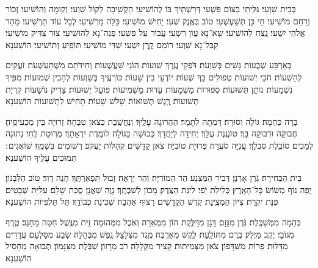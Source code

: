 \documentclass[twoside, openany, parskip=half, 11pt]{book}
\begin{document}
בְּבֵית שַׁוְעִי׃ גִּלִּֽיתִי בַצּוֹם פִּשְׁעִי׃ דְּרַשְׁתִּֽיךָ בּוֹ לְהוֹשִׁיעִי׃ הַקְשִֽׁיבָה לְקוֹל שַׁוְעִי׃ וְקֽוּמָה וְהוֹשִׁיעִי׃ זְכוֹר וְרַחֵם מוֹשִׁיעִי׃ חַי כֵּן תְּשַׁעְשְׁעִי׃ טוֹב בְּאֶֽנֶק שְׁעִי׃ יָחִישׁ מוֹשִׁיעִי׃ כַּלֵּה מַרְשִׁיעִי׃ לְבַל עוֹד תַּרְשִׁיעִי׃ מַהֵר אֱלֹהֵי יִשְׁעִי׃ נֶֽצַח לְהוֹשִׁיעִי׃ שָׂא־נָא עֲוֹן רִשְׁעִי׃ עֲבוֹר עַל פִּשְׁעִי׃ פְּנֵה־נָא לְהוֹשִׁיעִי׃ צוּר צַדִּיק מוֹשִׁיעִי׃ קַבֵּל־נָא שַׁוְעִי׃ רוֹמֵם קֶֽרֶן יִשְׁעִי׃
שַׁדַּי מוֹשִׁיעִי׃ תּוֹפִֽיעַ וְתוֹשִׁיעִי׃ הוֹשַׁענָא׃


בְּאַרְבַּע שְׁבֻעוֹת׃ גָּשִׁים בְּשַׁוְעֹת׃ דֹּפְקֵי עֶֽרֶךְ שׁוּעוֹת׃ הוֹגֵי שַׁעֲשֻׁעוֹת׃ וְחִידֹתָם מִשְׁתַּעְשְׁעֹת׃ זֹעֲקִים לְהַשְׁעוֹת׃ חֹכֵי יְשׁוּעוֹת׃ טְפוּלִים בָּךְ שְׁעוֹת׃ יוֹדְעֵי בִין שָׁעוֹת׃ כּוֹרְעֶֽיךָ בְּשַׁוְּעוֹת׃ לְהָבִין שְׁמוּעוֹת׃ מִפִּֽיךָ נִשְׁמָעוֹת׃ נוֹתֵן תְּשׁוּעוֹת׃ סְפוּרוֹת מַשְׁמָעוֹת׃ עֵדוּת מַשְׁמִיעוֹת׃ פּוֹעֵל יְשׁוּעוֹת׃ צַדִּיק נוֹשָׁעוֹת׃ קִרְיַת תְּשׁוּעוֹת׃ רֶֽגֶשׁ תְּשׁוּאוֹת׃
שָׁלֹשׁ שָׁעוֹת׃
תָּחִישׁ לִתְשׁוּעוֹת הוֹשַׁענָא



בָּרָה כַּחַמָּה׃ גּוֹלָה וְסוּרָה׃ דָּמְתָה לְתָמָר׃ הַהֲרוּגָה עָלֶֽיךָ׃ וְנֶחֱשֶֽׁבֶת כְּצֹאן טִבְחָה׃ זְרוּיָה בֵּין מַכְעִיסֶֽיהָ׃ חֲבוּקָה וּדְבוּקָה בָּךְ׃ טוֹעֶֽנֶת עֻלָּךְ׃ יְחִידָה לְיַחֲדָךְ׃ כְּבוּשָׁה בַּגּוֹלָה׃ לוֹמֶֽדֶת יִרְאָתָךְ׃ מְרֽוּטַת לֶֽחִי׃ נְתוּנָה לְמַכִים׃ סוֹבֶֽלֶת סִבְלָךְ׃ עֲנִיָּה סֹעֲרָה׃ פְּדוּיַת טוֹבִיָּה׃ צֹאן קָדָשִׁים׃ קְהִלּוֹת יַעֲקֹב׃ רְשׁוּמִים בִּשְׁמֶֽךָ׃
שׁוֹאֲגִים ׃
תְּמוּכִים עָלֶֽיךָ הוֹשַׁענָא׃


בֵּית הַבְּחִירָה׃ גֹּֽרֶן אָרְנָן׃ דְּבִיר הַמֻּצְנָע׃ הַר הַמּוֹרִיָּה׃ וְהַר יֵרָאֶה׃ זְבוּל תִּפְאַרְתֶּֽךָ׃ חָנָה דָוִד׃ טוֹב הַלְּבָנוֹן׃ יְפֵה נוֹף מְשׂוֹשׂ כׇּל־הָאָֽרֶץ׃ כְּלִֽילַת יֹֽפִי׃ לִינַת הַצֶּֽדֶק׃ מָכוֹן לְשִׁבְתֶּֽךָ׃ נָוֶה שַׁאֲנָן׃ סֻכַּת שָׁלֵם׃ עַלִיַּת שְׁבָטִים׃ פִּנַּת יִקְרַת׃ צִיּוֹן הַמְצֻיֶּֽנֶת׃ קֹֽדֶשׁ הַקֳּדָשִׁים׃ רָצוּף אַהֲבָה׃
שְׁכִינַת כְּבוֹדֶֽךָ׃
תֵּל תַּלְפִּיּוֹת הוֹשַׁענָא׃


בְּהֵמָה מִמְּשַׁכֶּֽלֶת׃ גֹּֽרֶן מִגָּזָם׃ דָּגָן מִדַּלֶּֽקֶת׃ הוֹן מִמְּאֵרָה׃ וְאֹֽכֶל מִמְּהוּמָה׃ זַֽיִת מִנֶּֽשֶׁל׃ חִטָּה מֵחָגָב׃ טֶֽרֶף מִגּוֹבַי׃ יֶקֶב מִיֶּלֶק׃ כֶּֽרֶם מִתּוֹלַֽעַת׃ לֶֽקֶשׁ מֵאַרְבֶּה׃ מֶֽגֶד מִצְּלָצַל׃ נֶֽפֶשׁ מִבֶּהָלָה׃ שֽׂבַע מִסָּלְעָם׃ עֲדָרִים מִדַּלּוּת׃ פֵּרוֹת מִשִּׁדָּפוֹן׃ צֹאן מִצְּמִיתוּת׃ קָצִיר מִקְּלָלָה׃ רֹב מֵרָזוֹן׃
שִׁבֹּֽלֶת מִצִּנָּמוֹן׃
תְּבוּאָה מֵחָסִיל הוֹשַׁענָא׃
\end{document}
